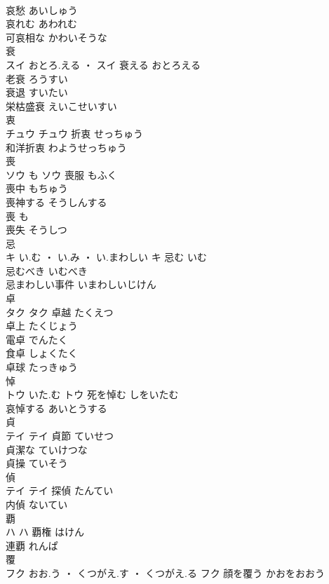 \documentclass[8pt]{extreport}
\begin{document}
\begin{CJK}{UTF8}{min}
\\	哀愁	あいしゅう	
\\	哀れむ	あわれむ	
\\	可哀相な	かわいそうな	
\\	衰	
\\	スイ	おとろ.える ・	スイ	衰える	おとろえる	
\\	老衰	ろうすい	
\\	衰退	すいたい	
\\	栄枯盛衰	えいこせいすい	
\\	衷	
\\	チュウ		チュウ	折衷	せっちゅう	
\\	和洋折衷	わようせっちゅう	
\\	喪	
\\	ソウ	も	ソウ	喪服	もふく	
\\	喪中	もちゅう	
\\	喪神する	そうしんする	
\\	喪	も	
\\	喪失	そうしつ	
\\	忌	
\\	キ	い.む ・ い.み ・ い.まわしい	キ	忌む	いむ	
\\	忌むべき	いむべき	
\\	忌まわしい事件	いまわしいじけん	
\\	卓	
\\	タク		タク	卓越	たくえつ	
\\	卓上	たくじょう	
\\	電卓	でんたく	
\\	食卓	しょくたく	
\\	卓球	たっきゅう	
\\	悼	
\\	トウ	いた.む	トウ	死を悼む	しをいたむ	
\\	哀悼する	あいとうする	
\\	貞	
\\	テイ		テイ	貞節	ていせつ	
\\	貞潔な	ていけつな	
\\	貞操	ていそう	
\\	偵	
\\	テイ		テイ	探偵	たんてい	
\\	内偵	ないてい	
\\	覇	
\\	ハ		ハ	覇権	はけん	
\\	連覇	れんぱ	
\\	覆	
\\	フク	おお.う ・ くつがえ.す ・ くつがえ.る	フク	顔を覆う	かおをおおう	

\end{CJK}
\end{document}
